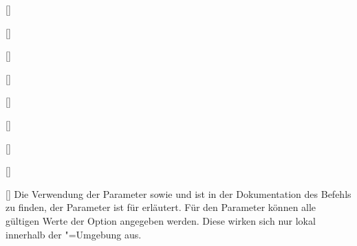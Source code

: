 \begin{Declaration}[v2.02]{[\LParameter]}
\begin{Declaration}{[]}
\begin{Declaration}[v2.02]{%
  []%
}
\begin{Declaration}[v2.02]{%
  []%
}
\begin{Declaration}{[\PSet]}
\begin{Declaration}{%
  []
}
\begin{Declaration}{[]}
\begin{Declaration}{[]}
\begin{Declaration}{[]}
Die Verwendung der Parameter  sowie
 und  ist 
in der Dokumentation des Befehls  zu finden, der Parameter 
 ist für  erläutert. Für den 
Parameter  können alle gültigen Werte 
der Option  angegeben werden. Diese wirken sich nur lokal 
innerhalb der "=Umgebung aus.
\end{Declaration}
\end{Declaration}
\end{Declaration}
\end{Declaration}
\end{Declaration}
\end{Declaration}
\end{Declaration}
\end{Declaration}
\end{Declaration}

